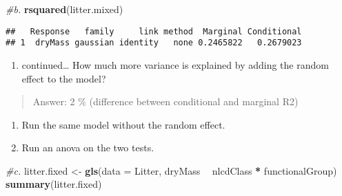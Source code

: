 \documentclass[]{article}
\newenvironment{Shaded}{\begin{snugshade}}{\end{snugshade}}
\newcommand{\CommentTok}[1]{\textcolor[rgb]{0.56,0.35,0.01}{\textit{#1}}}
\newcommand{\DataTypeTok}[1]{\textcolor[rgb]{0.13,0.29,0.53}{#1}}
\newcommand{\KeywordTok}[1]{\textcolor[rgb]{0.13,0.29,0.53}{\textbf{#1}}}
\newcommand{\NormalTok}[1]{#1}
\newcommand{\OperatorTok}[1]{\textcolor[rgb]{0.81,0.36,0.00}{\textbf{#1}}}
\newcommand{\StringTok}[1]{\textcolor[rgb]{0.31,0.60,0.02}{#1}}
\providecommand{\tightlist}{%
  \setlength{\itemsep}{0pt}\setlength{\parskip}{0pt}}
\begin{document}
\begin{Shaded}
\begin{Highlighting}[]
\CommentTok{#b. }
\KeywordTok{rsquared}\NormalTok{(litter.mixed)}
\end{Highlighting}
\end{Shaded}

\begin{verbatim}
##   Response   family     link method  Marginal Conditional
## 1  dryMass gaussian identity   none 0.2465822   0.2679023
\end{verbatim}

\begin{enumerate}
\def\labelenumi{\alph{enumi}.}
\setcounter{enumi}{1}
\tightlist
\item
  continued\ldots{} How much more variance is explained by adding the
  random effect to the model?
\end{enumerate}

\begin{quote}
Answer: 2 \% (difference between conditional and marginal R2)
\end{quote}

\begin{enumerate}
\def\labelenumi{\alph{enumi}.}
\setcounter{enumi}{2}
\tightlist
\item
  Run the same model without the random effect.
\item
  Run an anova on the two tests.
\end{enumerate}

\begin{Shaded}
\begin{Highlighting}[]
\CommentTok{#c. }
\NormalTok{litter.fixed <-}\StringTok{ }\KeywordTok{gls}\NormalTok{(}\DataTypeTok{data =}\NormalTok{ Litter,}
\NormalTok{                     dryMass }\OperatorTok{~}\StringTok{ }\NormalTok{nlcdClass }\OperatorTok{*}\StringTok{ }\NormalTok{functionalGroup)}
\KeywordTok{summary}\NormalTok{(litter.fixed)}
\end{Highlighting}
\end{Shaded}
\end{document}
